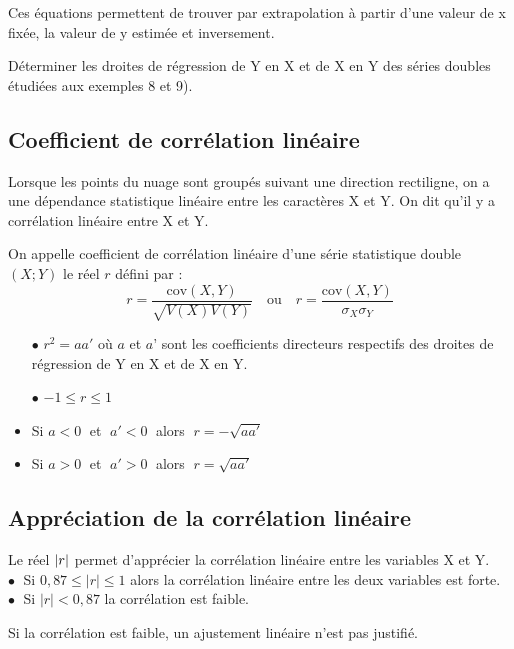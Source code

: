 \begin{remark}
 Ces équations permettent de trouver
par extrapolation à partir d’une valeur de x fixée,
la valeur de y estimée et inversement.
\end{remark}

\begin{exercice}
Déterminer les droites de régression de Y en X et de
X en Y des séries doubles étudiées aux exemples  8 et 9).
\end{exercice}
\subsection*{Coefficient de corrélation linéaire}
Lorsque les points du nuage sont groupés suivant
une direction rectiligne, on a une dépendance
statistique linéaire entre les caractères X et Y. On
dit qu’il y a corrélation linéaire entre X et Y.

\begin{definition}


On appelle coefficient de corrélation linéaire d’une série statistique double $(X ;Y)$ le réel $ r $ défini
par :  $$ r=\dfrac{\text{cov}(X,Y)}{\sqrt{V(X)V(Y)}}   \quad \text{ou} \quad  r=\dfrac{\text{cov}(X,Y)}{\sigma_{X}\sigma_{Y}}  $$

 \end{definition}
 
 \begin{property}
 
 \begin{itemize}
 \item[$ \bullet $] $ r^{2}=aa' $ où  $a $ et $ a’ $  sont les coefficients directeurs
respectifs des droites de régression de Y en X et de
X en Y.
\item[$ \bullet $]  $ -1\leq r \leq 1 $
\end{itemize}
 \end{property}

\begin{remark}
\begin{itemize}
 \item Si  $ a< 0 \;$  et $\; a'< 0\; $  alors $\; r=-\sqrt{aa'} $
\item Si  $ a> 0\; $  et $\; a'> 0\;$  alors $ \; r=\sqrt{aa'} $
\end{itemize}
\end{remark}
\subsection*{Appréciation de la corrélation linéaire }
Le réel $ \left\lvert r \right\rvert $ permet d’apprécier la corrélation
linéaire entre les variables X et Y.\\
  $ \bullet\; $  Si  $ 0,87 \leq |r| \leq1  $  alors la corrélation linéaire
entre les deux variables est forte.\\
 $ \bullet\; $ Si  $ | r | < 0,87 $ la corrélation est faible.
 \begin{remark}
  Si la corrélation est faible, un
ajustement linéaire n’est pas justifié.
\end{remark}




